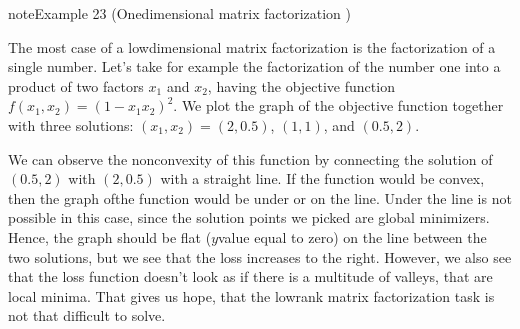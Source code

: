 \documentclass[letterpaper,10pt,english]{jupyterBook}
\begin{document}
\begin{sphinxadmonition}{note}{Example 23 (One\sphinxhyphen{}dimensional matrix factorization   )}



\sphinxAtStartPar
The most  case of a low\sphinxhyphen{}dimensional matrix factorization is the factorization of a single number. Let’s take for example the factorization of the number one into a product of two factors \(x_1\) and \(x_2\), having the objective function  \(f(x_1,x_2) = (1-x_1x_2)^2\). We plot the graph of the objective function together with three solutions: \((x_1,x_2)=(2,0.5)\), \((1,1)\), and \((0.5,2)\).
\begin{center}\end{center}
\sphinxAtStartPar
We can observe the nonconvexity of this function by connecting the solution of \((0.5,2)\) with \((2,0.5)\) with a straight line. If the function would be convex, then the graph ofthe function would be under or on the line. Under the line is not possible in this case, since the solution points we picked are global minimizers. Hence, the graph should be flat (\(y\)\sphinxhyphen{}value equal to zero) on the line between the two solutions, but we see that the loss increases to the right. However, we also see that the loss function doesn’t look as if there is a multitude of valleys, that are local minima. That gives us hope, that the low\sphinxhyphen{}rank matrix factorization task is not that difficult to solve.
\end{sphinxadmonition}
\end{document}
